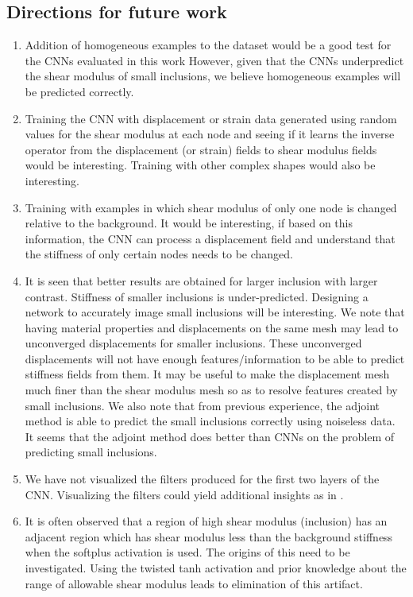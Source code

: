 \documentclass[12pt]{article}
\begin{document}
\subsection{Directions for future work}
\begin{enumerate}
\item{Addition of homogeneous examples to the dataset would be a good test for the CNNs evaluated in this work However, given that the CNNs underpredict the shear modulus of small inclusions, we believe homogeneous examples will be predicted correctly.}
\item{Training the CNN with displacement or strain data generated using random values for the shear modulus at each node and seeing if it learns the inverse operator from the displacement (or strain) fields to shear modulus fields would be interesting. Training with other complex shapes would also be interesting.}
\item{Training with examples in which shear modulus of only one node is changed relative to the background. It would be interesting, if based on this information, the CNN can process a displacement field and understand that the stiffness of only certain nodes needs to be changed.}
\item{It is seen that better results are obtained for larger inclusion with larger contrast. Stiffness of smaller inclusions is under-predicted. Designing a network to accurately image small inclusions will be interesting. We note that having material properties and displacements on the same mesh may lead to unconverged displacements for smaller inclusions. These unconverged displacements will not have enough features/information to be able to predict stiffness fields from them. It may be useful to make the displacement mesh much finer than the shear modulus mesh so as to resolve features created by small inclusions. We also note that from previous experience, the adjoint method \cite{paper:oberai2003} is able to predict the small inclusions correctly using noiseless data. It seems that the adjoint method does better than CNNs on the problem of predicting small inclusions.}
\item{We have not visualized the filters produced for the first two layers of the CNN. Visualizing the filters could yield additional insights as in \cite{paper:pateloberai2019}.}
\item{It is often observed that a region of high shear modulus (inclusion) has an adjacent region which has shear modulus less than the background stiffness when the softplus activation is used. The origins of this need to be investigated. Using the twisted tanh activation and prior knowledge about the range of allowable shear modulus leads to elimination of this artifact.}

\end{enumerate}
\end{document}
